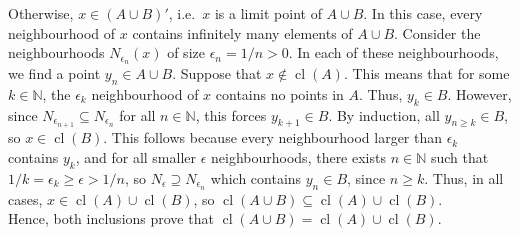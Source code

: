 \documentclass[10pt]{article}
\def\cl{\operatorname{cl}}
\begin{document}
        Otherwise, $x \in (A \cup B)'$, i.e.\ $x$ is a limit point of $ A\cup B$. 
        In this case, every neighbourhood of $x$ contains infinitely many elements of $A \cup B$.
        Consider the neighbourhoods $N_{\epsilon_n}(x)$ of size $\epsilon_n = 1 /n > 0$.
        In each of these neighbourhoods, we find a point $y_n \in A \cup B$.
        Suppose that $x \notin \cl(A)$. This means that for some $k \in \mathbb{N}$, the $\epsilon_k$ neighbourhood of
        $x$ contains no points in $A$. Thus, $y_k \in B$.
        However, since $N_{\epsilon_{n + 1}} \subseteq N_{\epsilon_{n}}$ for all $n \in \mathbb{N}$, this forces $y_{k + 1} \in B$.
        By induction, all $y_{n \geq k} \in B$, so $x \in \cl(B)$. This follows because every neighbourhood larger than $\epsilon_k$
        contains $y_k$, and for all smaller $\epsilon$ neighbourhoods, there exists $n \in \mathbb{N}$ such that 
        $1 /k = \epsilon_k \geq \epsilon > 1 /n$, so $N_{\epsilon} \supseteq N_{\epsilon_n}$ which contains $y_n \in B$, since $n \geq k$.
        Thus, in all cases, $x \in \cl(A) \cup \cl(B)$, so $\cl(A\cup B) \subseteq \cl(A) \cup \cl(B)$. \\

        Hence, both inclusions prove that $\cl(A\cup B) = \cl(A) \cup \cl(B)$.
\end{document}
